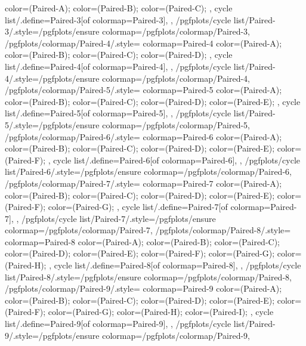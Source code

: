 {{{      color=(Paired-A);
      color=(Paired-B);
      color=(Paired-C);
    },
    cycle list/.define={Paired-3}{[of colormap=Paired-3]},
  },
  /pgfplots/cycle list/Paired-3/.style={/pgfplots/ensure colormap={/pgfplots/colormap/Paired-3}},
  /pgfplots/colormap/Paired-4/.style={
    colormap={Paired-4}{
      color=(Paired-A);
      color=(Paired-B);
      color=(Paired-C);
      color=(Paired-D);
    },
    cycle list/.define={Paired-4}{[of colormap=Paired-4]},
  },
  /pgfplots/cycle list/Paired-4/.style={/pgfplots/ensure colormap={/pgfplots/colormap/Paired-4}},
  /pgfplots/colormap/Paired-5/.style={
    colormap={Paired-5}{
      color=(Paired-A);
      color=(Paired-B);
      color=(Paired-C);
      color=(Paired-D);
      color=(Paired-E);
    },
    cycle list/.define={Paired-5}{[of colormap=Paired-5]},
  },
  /pgfplots/cycle list/Paired-5/.style={/pgfplots/ensure colormap={/pgfplots/colormap/Paired-5}},
  /pgfplots/colormap/Paired-6/.style={
    colormap={Paired-6}{
      color=(Paired-A);
      color=(Paired-B);
      color=(Paired-C);
      color=(Paired-D);
      color=(Paired-E);
      color=(Paired-F);
    },
    cycle list/.define={Paired-6}{[of colormap=Paired-6]},
  },
  /pgfplots/cycle list/Paired-6/.style={/pgfplots/ensure colormap={/pgfplots/colormap/Paired-6}},
  /pgfplots/colormap/Paired-7/.style={
    colormap={Paired-7}{
      color=(Paired-A);
      color=(Paired-B);
      color=(Paired-C);
      color=(Paired-D);
      color=(Paired-E);
      color=(Paired-F);
      color=(Paired-G);
    },
    cycle list/.define={Paired-7}{[of colormap=Paired-7]},
  },
  /pgfplots/cycle list/Paired-7/.style={/pgfplots/ensure colormap={/pgfplots/colormap/Paired-7}},
  /pgfplots/colormap/Paired-8/.style={
    colormap={Paired-8}{
      color=(Paired-A);
      color=(Paired-B);
      color=(Paired-C);
      color=(Paired-D);
      color=(Paired-E);
      color=(Paired-F);
      color=(Paired-G);
      color=(Paired-H);
    },
    cycle list/.define={Paired-8}{[of colormap=Paired-8]},
  },
  /pgfplots/cycle list/Paired-8/.style={/pgfplots/ensure colormap={/pgfplots/colormap/Paired-8}},
  /pgfplots/colormap/Paired-9/.style={
    colormap={Paired-9}{
      color=(Paired-A);
      color=(Paired-B);
      color=(Paired-C);
      color=(Paired-D);
      color=(Paired-E);
      color=(Paired-F);
      color=(Paired-G);
      color=(Paired-H);
      color=(Paired-I);
    },
    cycle list/.define={Paired-9}{[of colormap=Paired-9]},
  },
  /pgfplots/cycle list/Paired-9/.style={/pgfplots/ensure colormap={/pgfplots/colormap/Paired-9}},
}
